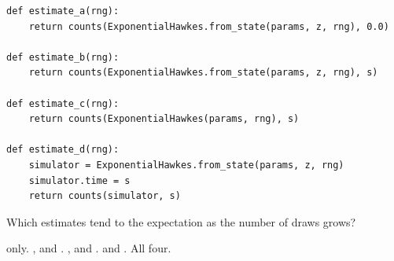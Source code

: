 \begin{question}
\begin{lstlisting}[caption={Four estimates of the expected counts after $s$}, label=listing.fanStartsTheClockAtZeroEstimates]
def estimate_a(rng):
    return counts(ExponentialHawkes.from_state(params, z, rng), 0.0)

def estimate_b(rng):
    return counts(ExponentialHawkes.from_state(params, z, rng), s)

def estimate_c(rng):
    return counts(ExponentialHawkes(params, rng), s)

def estimate_d(rng):
    simulator = ExponentialHawkes.from_state(params, z, rng)
    simulator.time = s
    return counts(simulator, s)
\end{lstlisting}
Which estimates tend to the expectation as the number of draws grows?
\begin{choices}
 \choice {} only.
 \choice {},  and .
 \choice {},  and .
 \correctchoice {} and .
 \choice All four.
\end{choices}
\end{question}

